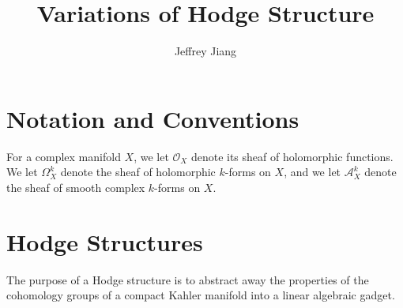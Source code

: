 \documentclass[psamsfonts, 12pt]{amsart}
\theoremstyle{definition}
\theoremstyle{remark}
\renewcommand{\O}{\mathcal{O}}
\begin{document}
%
\author{Jeffrey Jiang}
%
\title{Variations of Hodge Structure}
%
\maketitle
%
\tableofcontents
%
\section*{Notation and Conventions}
%
For a complex manifold $X$, we let $\O_X$ denote its sheaf of holomorphic functions.
We let $\Omega^k_X$ denote the sheaf of holomorphic $k$-forms on $X$, and
we let $\mathcal{A}^k_X$ denote the sheaf of smooth complex $k$-forms on $X$.
%
\section{Hodge Structures}
%
The purpose of a Hodge structure is to abstract away the properties of the
cohomology groups of a compact Kahler manifold into a linear algebraic gadget.
%
\end{document}

